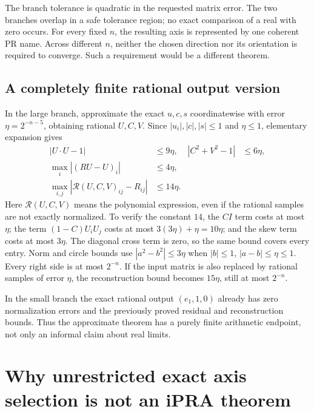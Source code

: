\documentclass[11pt]{article}
\theoremstyle{definition}\newtheorem{definition}[theorem]{Definition}
\begin{document}
The branch tolerance is quadratic in the requested matrix error. The
two branches overlap in a safe tolerance region; no exact comparison of
a real with zero occurs. For every fixed $n$, the resulting axis is
represented by one coherent PR name. Across different $n$, neither the
chosen direction nor its orientation is required to converge. Such a
requirement would be a different theorem.

\subsection{A completely finite rational output version}
In the large branch, approximate the exact $u,c,s$ coordinatewise with
error $\eta=2^{-n-5}$, obtaining rational $U,C,V$. Since
$|u_i|,|c|,|s|\le1$ and $\eta\le1$, elementary expansion gives
\begin{align}
 |U\cdot U-1|&\le9\eta,&|C^2+V^2-1|&\le6\eta,\label{eq:finite-unit}\\
 \max_i|(RU-U)_i|&\le4\eta,\label{eq:finite-resid}\\
 \max_{i,j}|\mathcal R(U,C,V)_{ij}-R_{ij}|&\le14\eta.\label{eq:finite-rod}
\end{align}
Here $\mathcal R(U,C,V)$ means the polynomial expression, even if the
rational samples are not exactly normalized. To verify the constant
$14$, the $C I$ term costs at most $\eta$; the term
$(1-C)U_iU_j$ costs at most $3(3\eta)+\eta=10\eta$; and the
skew term costs at most $3\eta$. The diagonal cross term is zero,
so the same bound covers every entry. Norm and circle bounds use
$|a^2-b^2|\le3\eta$ when $|b|\le1$, $|a-b|\le\eta\le1$.
Every right side is at most $2^{-n}$. If the input matrix is also
replaced by rational samples of error $\eta$, the reconstruction bound
becomes $15\eta$, still at most $2^{-n}$.

In the small branch the exact rational output $(e_1,1,0)$ already has
zero normalization errors and the previously proved residual and
reconstruction bounds. Thus the approximate theorem has a purely finite
arithmetic endpoint, not only an informal claim about real limits.

\section{Why unrestricted exact axis selection is not an iPRA theorem}
\label{sec:obstruction}
\end{document}
